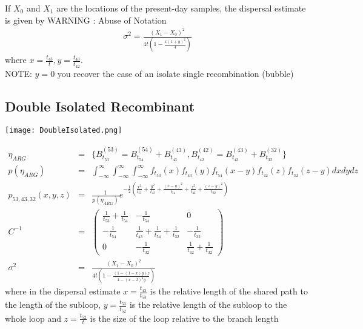 If $X_0$ and $X_1$ are the locations of the present-day samples, the dispersal estimate is given by 
WARNING : Abuse of Notation
\begin{eqnarray*}
\sigma^2 = \frac{(X_1-X_0)^2}{4t (1 - \frac{x (1 + y)^2}{4})}
\end{eqnarray*}
where $x = \frac{t_{43}}{t}, y = \frac{t_{43}}{t_{42}} $.\\
NOTE: $y=0$ you recover the case of an isolate single recombination (bubble)

\subsection*{Double Isolated Recombinant}
\begin{center}
\texttt{[image: DoubleIsolated.png]} 
\end{center}

\begin{eqnarray}
\eta_{ARG} &=& \{ B_{t_{53}}^{(53)} = B_{t_{54}}^{(54)} + B_{t_{43}}^{(43)}, B_{t_{42}}^{(42)} = B_{t_{43}}^{(43)} + B_{t_{32}}^{(32)}  \} \\
p(\eta_{ARG}) &=& \int_{-\infty}^{\infty} \int_{-\infty}^{\infty} \int_{-\infty}^{\infty} f_{t_{53}}(x)f_{t_{43}}(y)f_{t_{54}}(x-y) f_{t_{42}}(z)f_{t_{32}}(z-y) dx dydz \\
p_{53,43,32}(x,y,z) &=& \frac{1}{p(\eta_{ARG})} e^{ -\frac{1}{2}( \frac{x^2}{t_{53}} + \frac{y^2}{t_{43}} + \frac{(x-y)^2}{t_{54}} + \frac{z^2}{t_{42}} + \frac{(z-y)^2}{t_{32}}   ) } \\
C^{-1} &=& \begin{pmatrix}
\frac{1}{t_{53}} + \frac{1}{t_{54}} & -\frac{1}{t_{54}} & 0 \\
-\frac{1}{t_{54}} & \frac{1}{t_{43}} + \frac{1}{t_{54}} + \frac{1}{t_{32}} & -\frac{1}{t_{32}} \\
0 & -\frac{1}{t_{32}} & \frac{1}{t_{42}} + \frac{1}{t_{32}} 
\end{pmatrix}\\
\sigma^2 &=& \frac{(X_1-X_0)^2}{4t (1 - \frac{(1 - (1-x) y) z}{4 - (x-2)^2 y} )}
\end{eqnarray}
where in the dispersal estimate $x=\frac{t_{43}}{t_{53}}$ is the relative length of the shared path to the length of the subloop, $y=\frac{t_{53}}{t_{52}}$ is the relative length of the subloop to the whole loop and $z=\frac{t_{52}}{t}$ is the size of the loop relative to the branch length

